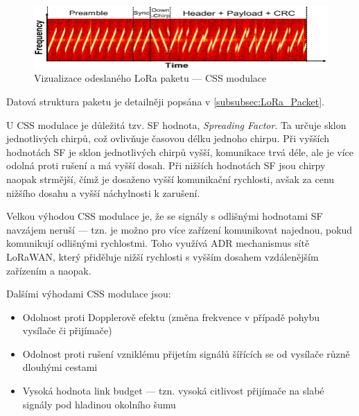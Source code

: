     \begin{figure}[h]
        \begin{centering}
            \includegraphics[width=1\textwidth]{Figures/lora_packet_chirps}
            \caption{Vizualizace odeslaného LoRa paketu --- CSS modulace}
            \label{fig:LoRa_packetvizualisation}
        \end{centering}
    \end{figure}

    Datová struktura paketu je detailněji popsána v \ref{subsubsec:LoRa_Packet}.
    
    U CSS modulace je důležitá tzv. SF hodnota, \textit{Spreading Factor}. 
    Ta určuje sklon jednotlivých 
    chirpů, což ovlivňuje časovou délku jednoho chirpu. Při vyšších
    hodnotách SF je sklon jednotlivých chirpů vyšší, komunikace trvá déle, ale
    je více odolná proti rušení a má vyšší dosah.
    Při nižších hodnotách SF jsou chirpy naopak strmější, čímž je dosaženo vyšší
    komunikační rychlosti, avšak za cenu nižšího dosahu a vyšší náchylnosti k
    zarušení.

    Velkou výhodou CSS modulace je, že se signály s odlišnými hodnotami SF 
    navzájem neruší --- tzn. je možno pro více zařízení komunikovat najednou,
    pokud komunikují odlišnými rychlostmi. Toho využívá ADR mechanismus sítě
    LoRaWAN, který přiděluje nižší rychlosti s vyšším dosahem vzdálenějším
    zařízením a naopak.

    Dalšími výhodami CSS modulace jsou:
    \begin{itemize}
        \item Odolnost proti Dopplerově efektu (změna frekvence v případě pohybu 
            vysílače či přijímače)
        \item Odolnost proti rušení vzniklému přijetím signálů šířících se od
            vysílače různě dlouhými cestami
        \item Vysoká hodnota link budget --- tzn. vysoká citlivost přijímače na
            slabé signály pod hladinou okolního šumu
    \end{itemize}


